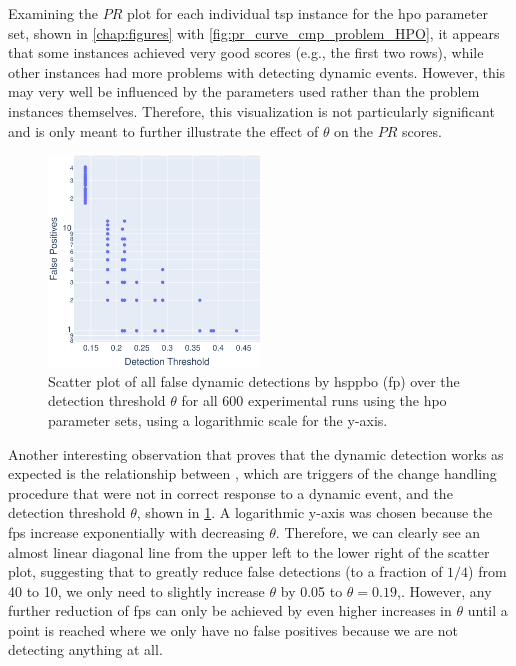 Examining the $PR$ plot for each individual \gls{tsp} instance for the \gls{hpo} parameter set, shown in \cref{chap:figures} with \cref{fig:pr_curve_cmp_problem_HPO}, it appears that some instances achieved very good scores (e.g., the first two rows), while other instances had more problems with detecting dynamic events. However, this may very well be influenced by the parameters used rather than the problem instances themselves. Therefore, this visualization is not particularly significant and is only meant to further illustrate the effect of $\theta$ on the $PR$ scores.

\begin{figure}[h]
	\centering
	\includegraphics[width=0.5\textwidth]{results/part3/fp_theta_plot_HPO.svg}
	\caption[Scatter plot of all false dynamic detections by \gls{hsppbo} (\glsdesc{fp}) over the detection threshold $\theta$]{Scatter plot of all false dynamic detections by \gls{hsppbo} (\glsdesc{fp}) over the detection threshold $\theta$ for all 600 experimental runs using the \gls{hpo} parameter sets, using a logarithmic scale for the y-axis.}
	\label{fig:fp_theta_plot_HPO}
\end{figure}

Another interesting observation that proves that the dynamic detection works as expected is the relationship between , which are triggers of the change handling procedure that were not in correct response to a dynamic event, and the detection threshold $\theta$, shown in \cref{fig:fp_theta_plot_HPO}. A logarithmic y-axis was chosen because the \glspl{fp} increase exponentially with decreasing $\theta$. Therefore, we can clearly see an almost linear diagonal line from the upper left to the lower right of the scatter plot, suggesting that to greatly reduce false detections (to a fraction of $1/4$) from 40 to 10, we only need to slightly increase $\theta$ by 0.05 to $\theta = 0.19$,. However, any further reduction of \glspl{fp} can only be achieved by even higher increases in $\theta$ until a point is reached where we only have no false positives because we are not detecting anything at all.

